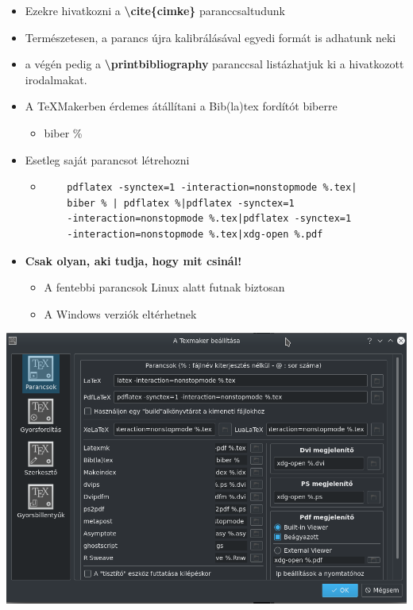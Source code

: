 \documentclass[11pt]{beamer}
\newcommand{\tbs}{\textbackslash}
\begin{document}
\begin{frame}
\begin{itemize}
\item Ezekre hivatkozni a \textbf{\tbs cite\{cimke\}} paranccsaltudunk
\item Természetesen, a parancs újra kalibrálásával egyedi formát is adhatunk neki
\item a végén pedig a \textbf{\tbs printbibliography} paranccsal listázhatjuk ki a hivatkozott irodalmakat.
\end{itemize}
\end{frame}

\begin{frame}[fragile]
\begin{itemize}
\item A TeXMakerben érdemes átállítani a Bib(la)tex fordítót biberre
	\begin{itemize}
	\item biber \%
	\end{itemize}
\item Esetleg saját parancsot létrehozni
	\begin{itemize}
	\item \begin{verbatim}
	pdflatex -synctex=1 -interaction=nonstopmode %.tex|
	biber % | pdflatex %|pdflatex -synctex=1 
	-interaction=nonstopmode %.tex|pdflatex -synctex=1 
	-interaction=nonstopmode %.tex|xdg-open %.pdf
	\end{verbatim}
	\end{itemize}
\item \textbf{Csak olyan, aki tudja, hogy mit csinál!}
	\begin{itemize}
	\item A fentebbi parancsok Linux alatt futnak biztosan
	\item A Windows verziók eltérhetnek
	\end{itemize}
\end{itemize}
\end{frame}

\begin{frame}
\includegraphics[scale=0.5]{kep} 
\end{frame}
\end{document}
